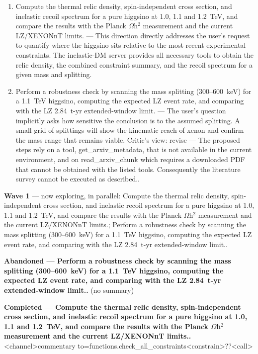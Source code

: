 \documentclass[11pt,a4paper]{article}
\begin{document}
\begin{enumerate}
  \item Compute the thermal relic density, spin-independent cross section, and inelastic recoil spectrum for a pure higgsino at 1.0, 1.1 and 1.2~TeV, and compare the results with the Planck $\Omega$h$^2$ measurement and the current LZ/XENONnT limits. --- This direction directly addresses the user's request to quantify where the higgsino sits relative to the most recent experimental constraints. The inelastic-DM server provides all necessary tools to obtain the relic density, the combined constraint summary, and the recoil spectrum for a given mass and splitting.
  \item Perform a robustness check by scanning the mass splitting (300--600~keV) for a 1.1~TeV higgsino, computing the expected LZ event rate, and comparing with the LZ 2.84~t-yr extended-window limit. --- The user's question implicitly asks how sensitive the conclusion is to the assumed splitting. A small grid of splittings will show the kinematic reach of xenon and confirm the mass range that remains viable.
Critic's view: revise --- The proposed steps rely on a tool, get\_arxiv\_metadata, that is not available in the current environment, and on read\_arxiv\_chunk which requires a downloaded PDF that cannot be obtained with the listed tools. Consequently the literature survey cannot be executed as described..

\end{enumerate}
\textbf{Wave 1} --- now exploring, in parallel: Compute the thermal relic density, spin-independent cross section, and inelastic recoil spectrum for a pure higgsino at 1.0, 1.1 and 1.2~TeV, and compare the results with the Planck $\Omega$h$^2$ measurement and the current LZ/XENONnT limits.; Perform a robustness check by scanning the mass splitting (300--600~keV) for a 1.1~TeV higgsino, computing the expected LZ event rate, and comparing with the LZ 2.84~t-yr extended-window limit..

\textbf{Abandoned --- Perform a robustness check by scanning the mass splitting (300--600~keV) for a 1.1~TeV higgsino, computing the expected LZ event rate, and comparing with the LZ 2.84~t-yr extended-window limit..} (no summary)

\textbf{Completed --- Compute the thermal relic density, spin-independent cross section, and inelastic recoil spectrum for a pure higgsino at 1.0, 1.1 and 1.2~TeV, and compare the results with the Planck $\Omega$h$^2$ measurement and the current LZ/XENONnT limits..} \textless{}\textbar{}channel\textbar{}\textgreater{}commentary to=functions.check\_all\_constraints\textless{}\textbar{}constrain\textbar{}\textgreater{}??\textless{}\textbar{}call\textbar{}\textgreater{}
\end{document}
